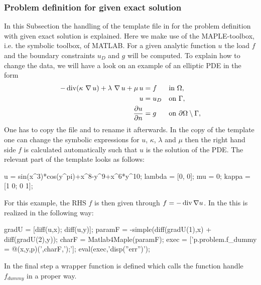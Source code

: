 \subsubsection{Problem definition for given exact solution}
\label{sect:QuickStart:ProblemDefinition:Exact}

\noindent
In this Subsection the handling of the template file  in  for the problem definition with given exact solution is explained. Here we make use of the MAPLE-toolbox, i.e. the symbolic toolbox, of MATLAB. For a given analytic function $u$ the load $f$ and the boundary constraints $u_D$ and $g$ will be computed. To explain how to change the data, we will have a look on an example of an elliptic PDE in the form
\begin{align*}
- \operatorname{div} (\kappa \,\operatorname{\nabla} u) + \lambda \,\operatorname{\nabla} u + \mu \, u &= f &&\text{in } \Omega,\\
u &= u_D &&\text{on } \Gamma,\\
\frac{\partial u}{\partial n} &= g &&\text{on } \partial\Omega \setminus \Gamma,
\end{align*}
One has to copy the file  and to rename it afterwards. In the copy of the template one can change the symbolic expressions for $u$, $\kappa$, $\lambda$ and $\mu$ then the right hand side $f$ is calculated automatically such that $u$ is the solution of the PDE. The relevant part of the template  looks as follows:

\begin{pcode}
u = sin(x^3)*cos(y^pi)+x^8-y^9+x^6*y^10;
lambda = [0, 0];
mu = 0;
kappa = [1 0; 0 1];
\end{pcode}

\bigskip

\noindent For this example, the RHS $f$ is then given through $f = -\operatorname{div}\nabla u$. In the \FFW this is realized in the following way:

\bigskip

\begin{pcode}
gradU = [diff(u,x); diff(u,y)];
paramF = -simple(diff(gradU(1),x) + diff(gradU(2),y));
charF = Matlab4Maple(paramF);
exec = ['p.problem.f_dummy = @(x,y,p)(',charF,');'];
eval(exec,'disp(''err'')');
\end{pcode}

\bigskip

\noindent In the final step a wrapper function is defined which calls the function handle $f_{dummy}$ in a proper way.

